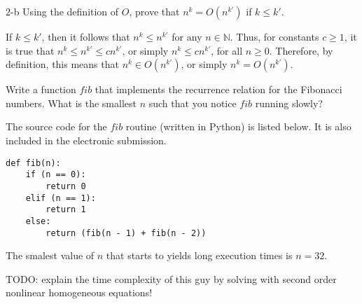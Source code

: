 \documentclass[11pt]{article}
\begin{document}
\begin{prob}{2-b}
Using the definition of $O$, prove that $n^{k} = O(n^{k'})$ if $k \leq k'$.
\end{prob}
\begin{sol} 

If $k \leq k'$, then it follows that $n^{k} \leq n^{k'}$ for any $n \in \mathbb{N}$. Thus, for constants $c \geq 1$, it is true that $n^{k} \leq n^{k'} \leq cn^{k'}$, or simply $n^{k} \leq cn^{k'}$, for all $n \geq 0$. Therefore, by definition, this means that $n^{k} \in O(n^{k'})$, or simply $n^{k} = O(n^{k'})$.

\end{sol}

\begin{prob}{3}
Write a function $fib$ that implements the recurrence relation for the Fibonacci numbers. What is the smallest $n$ such that you notice $fib$ running slowly?
\end{prob}
\begin{sol} 
The source code for the $fib$ routine (written in Python) is listed below. It is also included in the electronic submission.

\begin{lstlisting}
def fib(n):
	if (n == 0):
		return 0
	elif (n == 1):
		return 1
	else:
		return (fib(n - 1) + fib(n - 2))
\end{lstlisting}

The smalest value of $n$ that starts to yields long execution times is $n = 32$.

TODO: explain the time complexity of this guy by solving with second order nonlinear homogeneous equations!
\end{sol}
\end{document}
